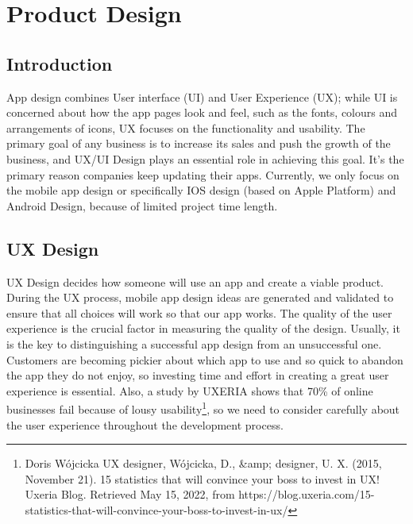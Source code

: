 \documentclass[11pt]{article}
\begin{document}



\chapter{Product Design} %

\label{Chapter2} %

\section{Introduction}
App design combines User interface (UI) and User Experience (UX); while UI is concerned about how the app pages look and feel, such as the fonts, colours and arrangements of icons, UX focuses on the functionality and usability. The primary goal of any business is to increase its sales and push the growth of the business, and UX/UI Design plays an essential role in achieving this goal. It's the primary reason companies keep updating their apps. Currently, we only focus on the mobile app design or specifically IOS design (based on Apple Platform) and Android Design, because of limited project time length.
\section{UX Design}
UX Design decides how someone will use an app and create a viable product. During the UX process, mobile app design ideas are generated and validated to ensure that all choices will work so that our app works. The quality of the user experience is the crucial factor in measuring the quality of the design. Usually, it is the key to distinguishing a successful app design from an unsuccessful one. Customers are becoming pickier about which app to use and so quick to abandon the app they do not enjoy, so investing time and effort in creating a great user experience is essential. Also, a study by UXERIA shows that 70\% of online businesses fail because of lousy usability\footnote{Doris Wójcicka UX designer, Wójcicka, D., &amp; designer, U. X. (2015, November 21). 15 statistics that will convince your boss to invest in UX! Uxeria Blog. Retrieved May 15, 2022, from https://blog.uxeria.com/15-statistics-that-will-convince-your-boss-to-invest-in-ux/ }, so we need to consider carefully about the user experience throughout the development process.
\end{document}

